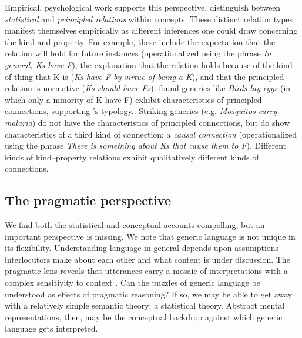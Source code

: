 \documentclass[12pt,letterpaper]{article}
\begin{document}
Empirical, psychological work supports this perspective.
 distinguish between \emph{statistical} and \emph{principled relations} within concepts. 
These distinct relation types manifest themselves empirically as different inferences one could draw concerning the kind and property. 
For example, these include the expectation that the relation will hold for future instances (operationalized using the phrase \emph{In general, Ks have F}), the explanation that the relation holds because of the kind of thing that K is (\emph{Ks have F by virtue of being a K}), and that the principled relation is normative (\emph{Ks should have Fs}).
 found generics like \emph{Birds lay eggs} (in which only a minority of K have F) exhibit characteristics of principled connections, supporting 's typology.. 
Striking generics (e.g. \emph{Mosquitos carry malaria}) do not have the characteristics of principled connections, but do show characteristics of a third kind of connection: a \emph{causal connection} (operationalized using the phrase \emph{There is something about Ks that cause them to F}). 
Different kinds of kind--property relations exhibit qualitatively different kinds of connections. 




\subsection*{The pragmatic perspective}

We find both the statistical and conceptual accounts compelling, but an important perspective is missing.
We note that generic language is not unique in its flexibility.
Understanding language in general depends upon assumptions interlocutors make about each other and what content is under discussion. 
The pragmatic lens reveals that utterances carry a mosaic of interpretations with a complex sensitivity to context \cite{Clark1996,Grice1975,Levinson2000}. 
Can the puzzles of generic language be understood as effects of pragmatic reasoning?
If so, we may be able to get away with a relatively simple semantic theory: a statistical theory.
Abstract mental representations, then, may be the conceptual backdrop against which generic language gets interpreted. 
\end{document}
